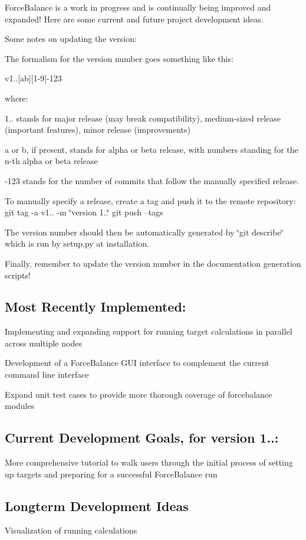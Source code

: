 Force\-Balance is a work in progress and is continually being improved and expanded! Here are some current and future project development ideas.

Some notes on updating the version\-:

The formalism for the version number goes something like this\-:

v1..\mbox{[}ab\mbox{]}\mbox{[}1-\/9\mbox{]}-\/123

where\-: \begin{DoxyItemize}
\item 1.. stands for major release (may break compatibility), medium-\/sized release (important features), minor release (improvements) \item a or b, if present, stands for alpha or beta release, with numbers standing for the n-\/th alpha or beta release \item -\/123 stands for the number of commits that follow the manually specified release.\end{DoxyItemize}
To manually specify a release, create a tag and push it to the remote repository\-: git tag -\/a v1.. -\/m \char`\"{}version 1..\char`\"{} git push --tags

The version number should then be automatically generated by \char`\"{}git describe\char`\"{} which is run by setup.\-py at installation.

Finally, remember to update the version number in the documentation generation scripts!\hypertarget{roadmap_recent}{}\subsection{Most Recently Implemented\-:}\label{roadmap_recent}
\begin{DoxyItemize}
\item Implementing and expanding support for running target calculations in parallel across multiple nodes \item Development of a Force\-Balance G\-U\-I interface to complement the current command line interface \item Expand unit test cases to provide more thorough coverage of forcebalance modules\end{DoxyItemize}
\hypertarget{roadmap_current}{}\subsection{Current Development Goals, for version 1..\-:}\label{roadmap_current}
\begin{DoxyItemize}
\item More comprehensive tutorial to walk users through the initial process of setting up targets and preparing for a successful Force\-Balance run\end{DoxyItemize}
\hypertarget{roadmap_longterm}{}\subsection{Longterm Development Ideas}\label{roadmap_longterm}
\begin{DoxyItemize}
\item Visualization of running calculations \end{DoxyItemize}
